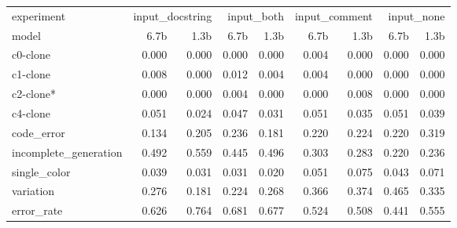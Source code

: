 \begin{tabular}{lrrrrrrrr}
\toprule
experiment & \multicolumn{2}{r}{input_docstring} & \multicolumn{2}{r}{input_both} & \multicolumn{2}{r}{input_comment} & \multicolumn{2}{r}{input_none} \\
model & 6.7b & 1.3b & 6.7b & 1.3b & 6.7b & 1.3b & 6.7b & 1.3b \\
\midrule
c0-clone & 0.000 & 0.000 & 0.000 & 0.000 & 0.004 & 0.000 & 0.000 & 0.000 \\
c1-clone & 0.008 & 0.000 & 0.012 & 0.004 & 0.004 & 0.000 & 0.000 & 0.000 \\
c2-clone* & 0.000 & 0.000 & 0.004 & 0.000 & 0.000 & 0.008 & 0.000 & 0.000 \\
c4-clone & 0.051 & 0.024 & 0.047 & 0.031 & 0.051 & 0.035 & 0.051 & 0.039 \\
code_error & 0.134 & 0.205 & 0.236 & 0.181 & 0.220 & 0.224 & 0.220 & 0.319 \\
incomplete_generation & 0.492 & 0.559 & 0.445 & 0.496 & 0.303 & 0.283 & 0.220 & 0.236 \\
single_color & 0.039 & 0.031 & 0.031 & 0.020 & 0.051 & 0.075 & 0.043 & 0.071 \\
variation & 0.276 & 0.181 & 0.224 & 0.268 & 0.366 & 0.374 & 0.465 & 0.335 \\
error_rate & 0.626 & 0.764 & 0.681 & 0.677 & 0.524 & 0.508 & 0.441 & 0.555 \\
\bottomrule
\end{tabular}
